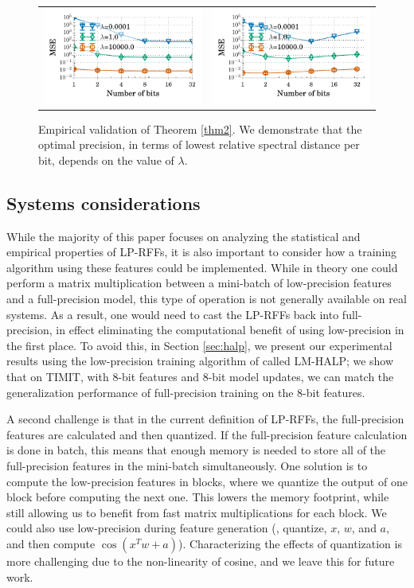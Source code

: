 \begin{figure}
	\centering
	\begin{tabular}{c c}
		\includegraphics[width=0.4\linewidth]{figures/theory_fixed_n_feat.pdf} &
		\includegraphics[width=0.4\linewidth]{figures/theory_fixed_memory.pdf} 
	\end{tabular}
	\caption{Empirical validation of Theorem \ref{thm2}.  We demonstrate that the optimal precision, in terms of lowest relative spectral distance per bit, depends on the value of $\lambda$.}
	\label{fig:theo_validation}
\end{figure}
\vsp
\subsection{Systems considerations}
While the majority of this paper focuses on analyzing the statistical and empirical properties of LP-RFFs, it is also important to consider how a training algorithm using these features could be implemented. While in theory one could perform a matrix multiplication between a mini-batch of low-precision features and a full-precision model, this type of operation is not generally available on real systems. As a result, one would need to cast the LP-RFFs back into full-precision, in effect eliminating the computational benefit of using low-precision in the first place.  To avoid this, in Section \ref{sec:halp}, we present our experimental results using the low-precision training algorithm of \citet{halp18} called LM-HALP; we show that on TIMIT, with 8-bit features and 8-bit model updates, we can match the generalization performance of full-precision training on the 8-bit features.

A second challenge is that in the current definition of LP-RFFs, the full-precision features are calculated and then quantized. If the full-precision feature calculation is done in batch, this means that enough memory is needed to store all of the full-precision features in the mini-batch simultaneously. One solution is to compute the low-precision features in blocks, where we quantize the output of one block before computing the next one. This lowers the memory footprint, while still allowing us to benefit from fast matrix multiplications for each block. We could also use low-precision during feature generation (\ie, quantize, $x$, $w$, and $a$, and then compute $\cos(x^T w + a)$).  Characterizing the effects of quantization is more challenging due to the non-linearity of cosine, and we leave this for future work.
